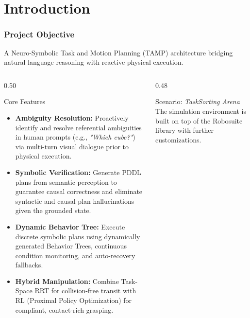 \documentclass[10pt]{beamer}
\begin{document}

\section{Introduction}
\begin{frame}[t]
    \frametitle{Project Objective}
    \footnotesize
    A Neuro-Symbolic Task and Motion Planning (TAMP) architecture bridging natural language reasoning with reactive physical execution.
    
    \vspace{0.15cm}
    \begin{columns}[T]
        \begin{column}{0.50\textwidth}
            \begin{block}{Core Features}
                \begin{itemize}\scriptsize
                    \item \textbf{Ambiguity Resolution:} Proactively identify and resolve referential ambiguities in human prompts (e.g., \textit{"Which cube?"}) via multi-turn visual dialogue prior to physical execution.
                    \item \textbf{Symbolic Verification:} Generate PDDL plans from semantic perception to guarantee causal correctness and eliminate syntactic and causal plan hallucinations given the grounded state.
                    \item \textbf{Dynamic Behavior Tree:} Execute discrete symbolic plans using dynamically generated Behavior Trees, continuous condition monitoring, and auto-recovery fallbacks.
                    \item \textbf{Hybrid Manipulation:} Combine Task-Space RRT for collision-free transit with RL (Proximal Policy Optimization) for compliant, contact-rich grasping.
                \end{itemize}
            \end{block}
        \end{column}

        \begin{column}{0.48\textwidth}
            \begin{block}{Scenario: \textit{TaskSorting Arena}}
                \scriptsize
                The simulation environment is built on top of the Robosuite library with further customizations.
                

\end{block}
\end{column}
\end{columns}
\end{frame}
\end{document}
